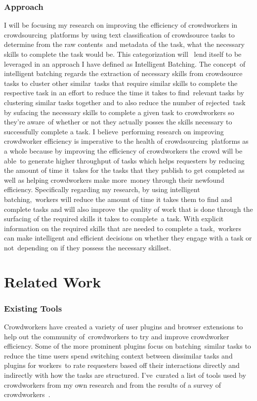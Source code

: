 \documentclass[letterpaper,12pt]{article}
\begin{document}
\subsection{Approach}
I will be focusing my research on improving the efficiency of crowdworkers in crowdsourcing\
platforms by using text classification of crowdsource tasks to determine from the raw contents\
and metadata of the task, what the necessary skills to complete the task would be. This categorization will \ 
lend itself to be leveraged in an approach I have defined as Intelligent Batching. The concept\ 
of intelligent batching regards the extraction of necessary skills from crowdsource tasks to cluster other similar\ 
tasks that require similar skills to complete the respective task in an effort to reduce the time it takes to find\
relevant tasks by clustering similar tasks together and to also reduce the number of rejected\
task by sufacing the necessary skills to complete a given task to crowdworkers so they're aware\
of whether or not they actually posses the skills necessary to successfully complete a task. I believe\
performing research on improving crowdworker efficiency is imperative to the health of crowdsourcing\
platforms as a whole because by improving the efficiency of crowdworkers the crowd will be able\
to generate higher throughput of tasks which helps requesters by reducing the amount of time it\
takes for the tasks that they publish to get completed as well as helping crowdworkers make more\
money through their newfound efficiency. Specifically regarding my research, by using intelligent batching,\
workers will reduce the amount of time it takes them to find and complete tasks and will also improve\
the quality of work that is done through the surfacing of the required skills it takes to complete\
a task. With explicit information on the required skills that are needed to complete a task,\
workers can make intelligent and efficient decisions on whether they engage with a task or not\
depending on if they possess the necessary skillset.

\chapter{Related Work}

\subsection{Existing Tools}
Crowdworkers have created a variety of user plugins and browser extensions to help out the community of\
crowdworkers to try and improve crowdworker efficiency. Some of the more prominent plugins focus on batching\
similar tasks to reduce the time users spend switching context between dissimilar tasks and plugins for workers\
to rate requesters based off their interactions directly and indirectly with how the tasks are structured. I've\
curated a list of tools used by crowdworkers from my own research and from the results of a survey of crowdworkers\
\cite{Kaplan2018}. 
\end{document}
